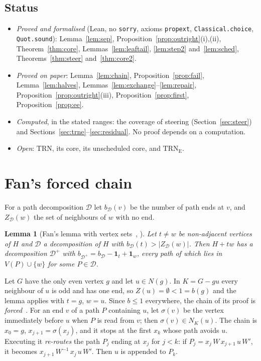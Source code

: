 \documentclass[11pt]{amsart}
\newtheorem{lemma}[theorem]{Lemma}
\theoremstyle{definition}
\newcommand{\cD}{\mathcal D}
\newcommand{\lean}[1]{\quad{\footnotesize[Lean: \texttt{#1}]}}
\newcommand{\TRN}{\mathrm{TRN}}
\newcommand{\TRNE}{\mathrm{TRN}_{\mathrm E}}
\begin{document}
\subsection*{Status}
\begin{itemize}
\item \emph{Proved and formalised} (Lean, no \texttt{sorry}, axioms \texttt{propext},
\texttt{Classical.choice}, \texttt{Quot.sound}): Lemma~\ref{lem:sep},
Proposition~\ref{prop:outright}(i),(ii), Theorem~\ref{thm:core}, Lemmas~\ref{lem:leaftail},
\ref{lem:step2} and~\ref{lem:sched}, Theorems~\ref{thm:steer} and~\ref{thm:core2}.
\item \emph{Proved on paper}: Lemma~\ref{lem:chain}, Proposition~\ref{prop:fail},
Lemma~\ref{lem:halves}, Lemmas~\ref{lem:exchange}--\ref{lem:repair},
Proposition~\ref{prop:outright}(iii), Proposition~\ref{prop:first}, Proposition~\ref{prop:ee}.
\item \emph{Computed}, in the stated ranges: the coverage of steering (Section~\ref{sec:steer}) and
Sections~\ref{sec:trne}--\ref{sec:residual}. No proof depends on a computation.
\item \emph{Open}: $\TRN$, its core, its unscheduled core, and $\TRNE$.
\end{itemize}

\section{Fan's forced chain}\label{sec:prelim}

For a path decomposition $\cD$ let $b_\cD(v)$ be the number of path ends at $v$, and $Z_\cD(w)$
the set of neighbours of $w$ with no end.

\begin{lemma}[Fan's lemma with vertex sets~{\cite{Fan05}, \cite[Lemma~2.2]{RD}}]\label{lem:fan}
Let $t\ne w$ be non-adjacent vertices of $H$ and $\cD$ a decomposition of $H$ with
$b_\cD(t)>|Z_\cD(w)|$. Then $H+tw$ has a decomposition $\cD^+$ with
$b_{\cD^+}=b_\cD-\mathbf 1_t+\mathbf 1_w$, every path of which lies in $V(P)\cup\{w\}$ for some
$P\in\cD$.\lean{fan\_single\_supp}
\end{lemma}

Let $G$ have the only even vertex $g$ and let $u\in N(g)$. In $K=G-gu$ every neighbour of $u$ is
odd and has one end, so $Z(u)=\emptyset<1=b(g)$ and the lemma applies with $t=g$, $w=u$. Since
$b\le1$ everywhere, the chain of its proof is \emph{forced}~\cite[Prop.~2.1]{TF}. For an end $v$ of
a path $P$ containing $u$, let $\sigma(v)$ be the vertex immediately before $u$ when $P$ is read from
$v$; then $\sigma(v)\in N_K(u)$. The chain is $x_0=g$, $x_{j+1}=\sigma(x_j)$, and it stops at the
first $x_k$ whose path avoids $u$. Executing it \emph{re-routes} the path $P_j$ ending at $x_j$ for
$j<k$: if $P_j=x_j\,W\,x_{j+1}\,u\,W'$, it becomes $x_{j+1}\,W^{-1}\,x_j\,u\,W'$. Then $u$ is appended
to $P_k$.
\end{document}
